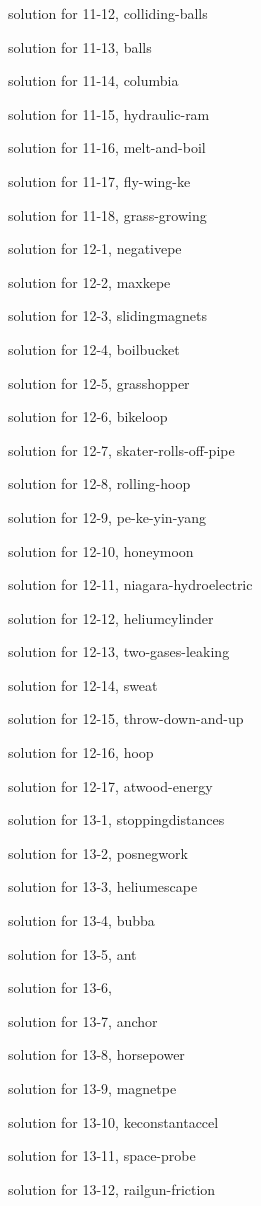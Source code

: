 \documentclass{problems}
\begin{document}
solution for 11-12, colliding-balls

solution for 11-13, balls

solution for 11-14, columbia

solution for 11-15, hydraulic-ram

solution for 11-16, melt-and-boil

solution for 11-17, fly-wing-ke

solution for 11-18, grass-growing

solution for 12-1, negativepe

solution for 12-2, maxkepe

solution for 12-3, slidingmagnets

solution for 12-4, boilbucket

solution for 12-5, grasshopper

solution for 12-6, bikeloop

solution for 12-7, skater-rolls-off-pipe

solution for 12-8, rolling-hoop

solution for 12-9, pe-ke-yin-yang

solution for 12-10, honeymoon

solution for 12-11, niagara-hydroelectric

solution for 12-12, heliumcylinder

solution for 12-13, two-gases-leaking

solution for 12-14, sweat

solution for 12-15, throw-down-and-up

solution for 12-16, hoop

solution for 12-17, atwood-energy

solution for 13-1, stoppingdistances

solution for 13-2, posnegwork

solution for 13-3, heliumescape

solution for 13-4, bubba

solution for 13-5, ant

solution for 13-6, 

solution for 13-7, anchor

solution for 13-8, horsepower

solution for 13-9, magnetpe

solution for 13-10, keconstantaccel

solution for 13-11, space-probe

solution for 13-12, railgun-friction
\end{document}
